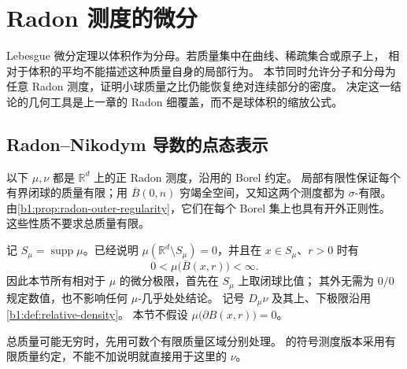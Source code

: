 \section{Radon 测度的微分}
\label{b1:sec:1403}


Lebesgue 微分定理以体积作为分母。若质量集中在曲线、稀疏集合或原子上，
相对于体积的平均不能描述这种质量自身的局部行为。
本节同时允许分子和分母为任意 Radon 测度，证明小球质量之比仍能恢复绝对连续部分的密度。
决定这一结论的几何工具是上一章的 Radon 细覆盖，而不是球体积的缩放公式。

\subsection{Radon--Nikodym 导数的点态表示}
\label{b1:subsec:140301}

以下 \(\mu,\nu\) 都是 \(\mathbb R^d\) 上的正 Radon 测度，沿用的 Borel 约定。
局部有限性保证每个有界闭球的质量有限；用 \(\overline B(0,n)\) 穷竭全空间，又知这两个测度都为 \(\sigma\)-有限。
由\cref{b1:prop:radon-outer-regularity}，它们在每个 Borel 集上也具有开外正则性。
这些性质不要求总质量有限。

\ProseParagraphBreak

记 \(S_\mu=\operatorname{supp}\mu\)。已经说明
\(\mu(\mathbb R^d\setminus S_\mu)=0\)，并且在 \(x\in S_\mu\)、\(r>0\) 时有
\[
 0<\mu\bigl(\overline B(x,r)\bigr)<\infty.
\]
因此本节所有相对于 \(\mu\) 的微分极限，首先在 \(S_\mu\) 上取闭球比值；
其外无需为 \(0/0\) 规定数值，也不影响任何 \(\mu\)-几乎处处结论。
记号 \(D_\mu\nu\) 及其上、下极限沿用\cref{b1:def:relative-density}。
本节不假设 \(\mu\bigl(\partial B(x,r)\bigr)=0\)。

\ProseParagraphBreak

总质量可能无穷时，先用可数个有限质量区域分别处理。
的符号测度版本采用有限质量约定，不能不加说明就直接用于这里的 \(\nu\)。

